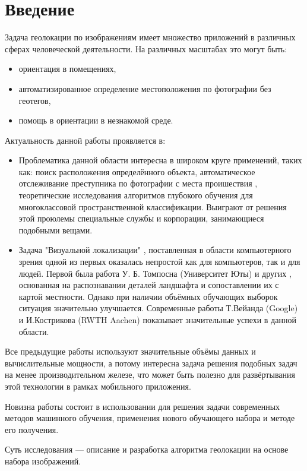\chapter*{Введение}
\label{sec:afterwords}

Задача геолокации по изображениям имеет множество приложений в различных сферах человеческой деятельности. На различных масштабах это могут быть: 
\begin{itemize}
\item ориентация в помещениях,
\item автоматизированное определение местоположения по фотографии без геотегов,
\item помощь в ориентации в незнакомой среде.
\end{itemize}

Актуальность данной работы проявляется в:
	\begin{itemize}
		\item Проблематика данной области интересна в широком круге применений, таких как: 
		поиск расположения определённого объекта, автоматическое отслеживание преступника по фотографии с места проишествия , теоретические исследования алгоритмов глубокого обучения для многоклассовой пространственной классификации. Выиграют от решения этой проюлемы специальные службы и корпорации, занимающиеся подобными вещами.
		\item Задача "Визуальной локализации" \cite{im2gps}, поставленная в области
		компьютерного зрения одной из первых оказалась непростой как для компьютеров,
		так и для людей. Первой была работа У. Б. Томпосна (Университет Юты) и других \cite{thompson1999geomReas}, основанная на распознавании деталей ландшафта и сопоставлении их с картой местности.
		Однако при наличии объёмных обучающих выборок ситуация значительно улучшается. Современные работы Т.Вейанда (Google) и И.Кострикова (RWTH Aachen) \cite{weyand2016planet} показывает значительные успехи в данной области.
			
	\end{itemize}

	Все предыдущие работы используют значительные объёмы данных и вычислительные мощности, а потому интересна задача решения подобных задач на менее производительном железе, что может быть полезно для развёртывания этой  технологии в рамках мобильного приложения.

	Новизна работы состоит в использовании для решения задачи современных методов машинного обучения, применения нового обучающего набора и методе его получения.
	
	Суть исследования --- описание и разработка алгоритма геолокации на основе набора изображений.

